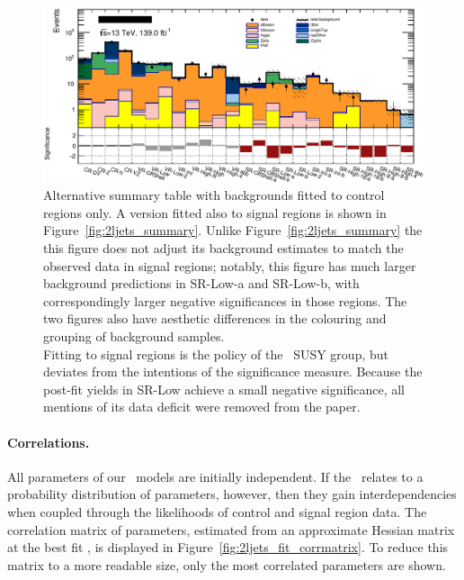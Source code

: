 \begin{figure}[tp]
\centering
\includegraphics[width=\textwidth]{figures/2ljets_summary_no_sr_log.png}
\caption[
Alternative summary table with backgrounds fitted to control regions only
]{%
Alternative summary table with backgrounds fitted to control regions only.
A version fitted also to signal regions is shown in
Figure~\ref{fig:2ljets_summary}.
Unlike Figure~\ref{fig:2ljets_summary} the this figure does not adjust its
background estimates to match the observed data in signal regions; notably,
this figure has much larger background predictions in SR-Low-a and SR-Low-b,
with correspondingly larger negative significances in those regions.
The two figures also have aesthetic differences in the colouring and grouping
of background samples.
\\[0.4em]
Fitting to signal regions is the policy of the \atlas\ SUSY group, but deviates
from the intentions of the significance measure.
Because the post-fit yields in SR-Low achieve a small negative significance,
all mentions of its data deficit were removed from the paper.
}
\label{fig:2ljets_summary_no_sr}
\end{figure}

\paragraph{Correlations.}
All parameters of our \histfactory\ models are initially independent.
If the \heplikelihood\ relates to a probability distribution of parameters,
however, then they gain interdependencies when coupled through the likelihoods
of control and signal region data.
The correlation matrix of parameters, estimated from an approximate Hessian
matrix at the best fit \heplikelihood, is displayed in
Figure~\ref{fig:2ljets_fit_corrmatrix}.
To reduce this matrix to a more readable size, only the most correlated
parameters are shown.

